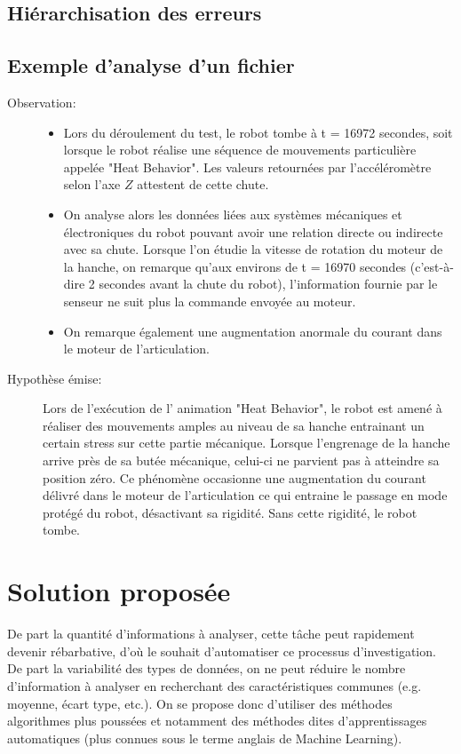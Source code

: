 \subsection{Hiérarchisation des erreurs}
\label{Introduction:Expression du besoin:Hiérarchisation des erreurs}

\subsection{Exemple d'analyse d'un fichier}
\label{Introduction:Expression du besoin:Exemple d'analyse d'un fichier}
\begin{description}
	\item[Observation:] 
	\begin{itemize}
		\item Lors du déroulement du test, le robot tombe à t = 16972 secondes, soit lorsque le robot réalise une séquence de mouvements particulière appelée "Heat Behavior". Les valeurs retournées par l'accéléromètre selon l'axe $Z$ attestent de cette chute.
		\item On analyse alors les données liées aux systèmes mécaniques et électroniques du robot pouvant avoir une relation directe ou indirecte avec sa chute.  Lorsque l'on étudie la vitesse de rotation du moteur de la hanche, on remarque qu'aux environs de  t = 16970 secondes (c'est-à-dire 2 secondes avant la chute du robot), l'information fournie par le senseur ne suit plus la commande  envoyée au moteur.
		\item On remarque également une augmentation anormale du courant dans le moteur de l'articulation. 
	\end{itemize} 
	\item [Hypothèse émise:] Lors de l'exécution de l' animation "Heat Behavior", le robot est amené à réaliser des mouvements amples au niveau de sa hanche entrainant un certain stress sur cette partie mécanique. Lorsque l'engrenage de la hanche arrive près de sa butée mécanique, celui-ci ne parvient pas à atteindre sa position zéro.  Ce phénomène occasionne une augmentation du courant délivré dans le moteur de l'articulation ce qui entraine le passage en mode protégé du robot, désactivant sa rigidité.  Sans cette rigidité, le robot tombe. 
\end{description}


\section{Solution proposée}
De part la quantité d'informations à analyser, cette tâche peut rapidement devenir rébarbative, d'où le souhait d'automatiser ce processus d'investigation. De part la variabilité des types de données, on ne peut réduire le nombre d'information à analyser en recherchant des caractéristiques communes (e.g. moyenne, écart type, etc.). On se propose donc d'utiliser des méthodes algorithmes plus poussées  et notamment des méthodes dites  d'apprentissages automatiques (plus connues sous le terme anglais de Machine Learning). 